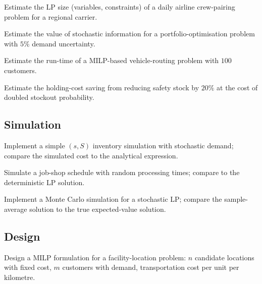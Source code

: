 \begin{exercise}
Estimate the LP size (variables, constraints) of a daily airline crew-pairing problem for a regional carrier.
\end{exercise}

\begin{exercise}
Estimate the value of stochastic information for a portfolio-optimisation problem with $5\%$ demand uncertainty.
\end{exercise}

\begin{exercise}
Estimate the run-time of a MILP-based vehicle-routing problem with $100$ customers.
\end{exercise}

\begin{exercise}
Estimate the holding-cost saving from reducing safety stock by $20\%$ at the cost of doubled stockout probability.
\end{exercise}

\subsection*{Simulation}

\begin{exercise}
Implement a simple $(s, S)$ inventory simulation with stochastic demand; compare the simulated cost to the analytical expression.
\end{exercise}

\begin{exercise}
Simulate a job-shop schedule with random processing times; compare to the deterministic LP solution.
\end{exercise}

\begin{exercise}
Implement a Monte Carlo simulation for a stochastic LP; compare the sample-average solution to the true expected-value solution.
\end{exercise}

\subsection*{Design}

\begin{exercise}
Design a MILP formulation for a facility-location problem: $n$ candidate locations with fixed cost, $m$ customers with demand, transportation cost per unit per kilometre.
\end{exercise}


